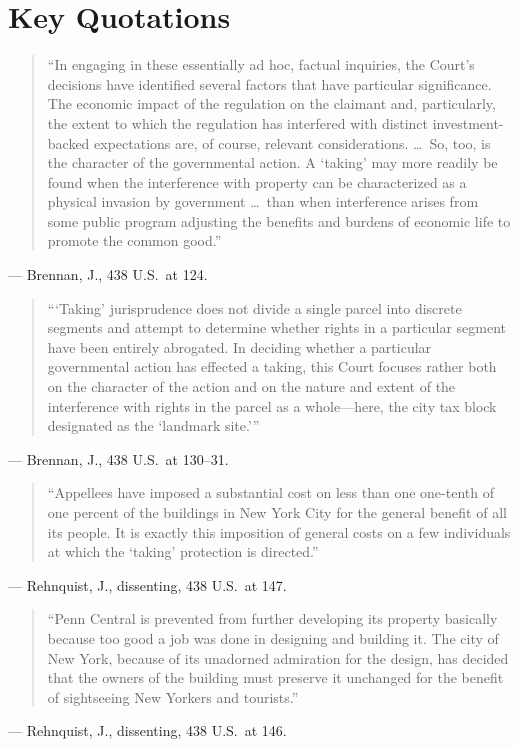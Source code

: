 \documentclass[12pt]{article}
\begin{document}
\section{Key Quotations}
\begin{quote}
``In engaging in these essentially ad hoc, factual inquiries, the Court's decisions have identified several factors that have particular significance. The economic impact of the regulation on the claimant and, particularly, the extent to which the regulation has interfered with distinct investment-backed expectations are, of course, relevant considerations. \dots\ So, too, is the character of the governmental action. A `taking' may more readily be found when the interference with property can be characterized as a physical invasion by government \dots\ than when interference arises from some public program adjusting the benefits and burdens of economic life to promote the common good.''
\end{quote}
\noindent --- Brennan, J., 438 U.S.\ at 124.

\begin{quote}
```Taking' jurisprudence does not divide a single parcel into discrete segments and attempt to determine whether rights in a particular segment have been entirely abrogated. In deciding whether a particular governmental action has effected a taking, this Court focuses rather both on the character of the action and on the nature and extent of the interference with rights in the parcel as a whole---here, the city tax block designated as the `landmark site.'''
\end{quote}
\noindent --- Brennan, J., 438 U.S.\ at 130--31.

\begin{quote}
``Appellees have imposed a substantial cost on less than one one-tenth of one percent of the buildings in New York City for the general benefit of all its people. It is exactly this imposition of general costs on a few individuals at which the `taking' protection is directed.''
\end{quote}
\noindent --- Rehnquist, J., dissenting, 438 U.S.\ at 147.

\begin{quote}
``Penn Central is prevented from further developing its property basically because too good a job was done in designing and building it. The city of New York, because of its unadorned admiration for the design, has decided that the owners of the building must preserve it unchanged for the benefit of sightseeing New Yorkers and tourists.''
\end{quote}
\noindent --- Rehnquist, J., dissenting, 438 U.S.\ at 146.
\end{document}
